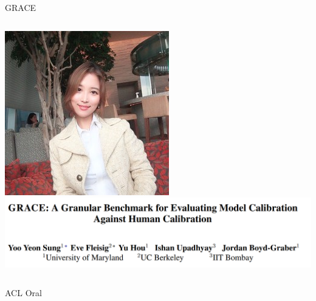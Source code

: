 \documentclass[compress]{beamer}
\newcommand{\fsi}[2]{
\begin{frame}[plain]
\vspace*{-1pt}
\makebox[\linewidth]{\texttt{[image: \#1]}}
\begin{center}
#2
\end{center}
\end{frame}
}
\begin{document}
\begin{frame}{GRACE}
	\begin{columns}
		
		\includegraphics[width=1.0\linewidth]{general_figures/yooyeon}
		\includegraphics[width=1.0\linewidth]{calibration/grace_paper}
	\end{columns}
	\centering
	ACL Oral
\end{frame}



\fsi{calibration/hallucination_tax}{}

\fsi{calibration/abstention_bench}{}

\fsi{calibration/hallucination_tax}{}

\fsi{calibration/p_buzz_given_correct_0}{}

\fsi{calibration/p_buzz_given_correct_1}{}

\fsi{calibration/p_buzz_given_correct_2}{}

\fsi{calibration/p_buzz_given_correct_3}{}
\end{document}
